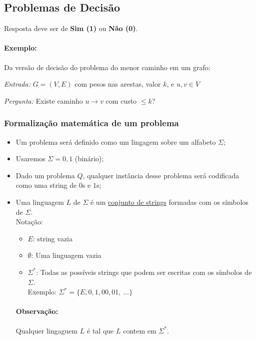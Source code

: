 \documentclass[a4paper,oneside,article,table]{article}
\begin{document}
\subsection{Problemas de Decisão}
Resposta deve ser de \textbf{Sim (1)} ou \textbf{Não (0)}.

\paragraph{Exemplo:} Da versão de decisão do problema do menor caminho em um grafo:
\begin{description}
    \item \textit{Entrada:} $G= (V,E)$ com pesos nas arestas, valor $k$, e $u,v \in V$
    \item \textit{Pergunta:} Existe caminho $u \to v$ com custo $\leq k$?
\end{description}


\subsubsection{Formalização matemática de um problema}
\begin{itemize}
    \item Um problema será definido como um lingagem sobre um alfabeto $\Sigma$;
    \item Usaremos $\Sigma = {0,1}$ (binário);
    \item Dado um problema $Q$, qualquer instância desse problema será codificada como uma string de $0$s e $1$s;
    \item Uma linguagem \underline{$L$} de $\Sigma$ é um \underline{conjunto de strings} formadas com os símbolos de $\Sigma$.\\
        Notação:
        \begin{itemize}
            \item $E$: string vazia
            \item $\emptyset$: Uma linguagem vazia
            \item $\Sigma^*$: Todas as possíveis strings que podem ser escritas com os símbolos de $\Sigma$.\\
                Exemplo: $\Sigma^* = \{E, 0, 1, 00, 01,~\ldots\}$
        \end{itemize}
    \paragraph{Observação:} Qualquer lingaguem $L$ é tal que $L$ contem em $\Sigma^*$.
\end{itemize}
\end{document}
